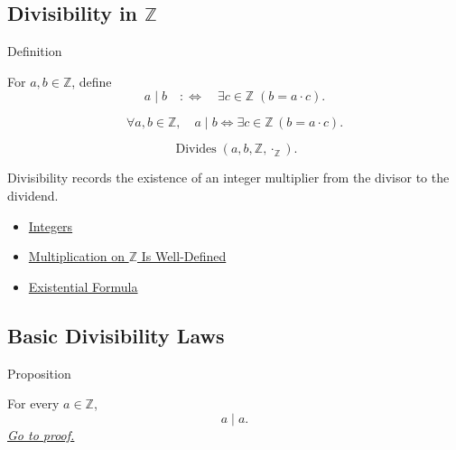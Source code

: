 \subsection*{\texorpdfstring{Divisibility in $\mathbb{Z}$}{Divisibility in Z}}

\begin{definitionbox}{Definition}
\begin{definition}
\label{def:divisibility-in-z}
For $a,b\in\mathbb{Z}$, define
\[
a\mid b
\quad:\Longleftrightarrow\quad
\exists c\in\mathbb{Z}\;(b=a\cdot c).
\]
\end{definition}
\end{definitionbox}

\begin{remark*}
\[
\forall a,b\in\mathbb{Z},\quad
a\mid b \Longleftrightarrow \exists c\in\mathbb{Z}\,(b=a\cdot c).
\]
\end{remark*}

\begin{remark*}
\[
\operatorname{Divides}(a,b,\mathbb{Z},\cdot_{\mathbb{Z}}).
\]
\end{remark*}

\begin{remark*}[Interpretation]
Divisibility records the existence of an integer multiplier from the divisor to
the dividend.
\end{remark*}

\begin{dependencies}
\begin{itemize}
  \item \hyperref[def:integers]{Integers}
  \item \hyperref[thm:multiplication-on-z-well-defined]{Multiplication on $\mathbb{Z}$ Is Well-Defined}
  \item \hyperref[def:existential-q]{Existential Formula}
\end{itemize}
\end{dependencies}

\subsection*{Basic Divisibility Laws}

\begin{propositionbox}{Proposition}
\begin{proposition}
\label{prop:divisibility-reflexive-on-z}
For every $a\in\mathbb{Z}$,
\[
a\mid a.
\]
\hyperref[prf:divisibility-reflexive-on-z]{\textit{Go to proof.}}
\end{proposition}
\end{propositionbox}

